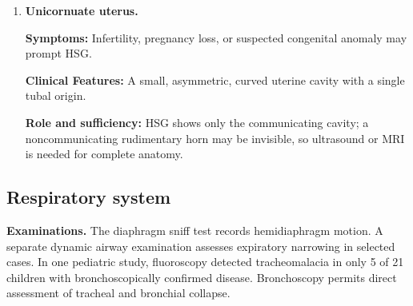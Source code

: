 \begin{enumerate}[leftmargin=*,itemsep=0.45em,topsep=0.4em]
\item \textbf{Unicornuate uterus.}\par\noindent\textbf{Symptoms:} Infertility, pregnancy loss, or suspected congenital anomaly may prompt HSG.\par\noindent\textbf{Clinical Features:} A small, asymmetric, curved uterine cavity with a single tubal origin.\par\noindent\textbf{Role and sufficiency:} HSG shows only the communicating cavity; a noncommunicating rudimentary horn may be invisible, so ultrasound or MRI is needed for complete anatomy.
\end{enumerate}

\subsection{Respiratory system}
\textbf{Examinations.} The diaphragm sniff test records hemidiaphragm motion. A separate dynamic airway examination assesses expiratory narrowing in selected cases. In one pediatric study, fluoroscopy detected tracheomalacia in only 5 of 21 children with bronchoscopically confirmed disease. Bronchoscopy permits direct assessment of tracheal and bronchial collapse.

